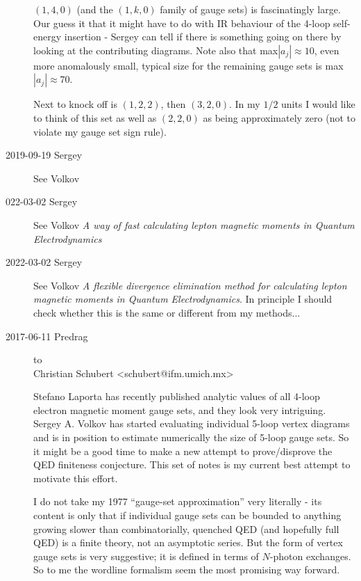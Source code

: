 \begin{description}
$(1,4,0)$ (and the $(1,k,0)$ family of gauge sets) is fascinatingly
large. Our guess it that it might have to do with IR behaviour of the
4-loop self-energy insertion - Sergey can tell if there is something
going on there by looking at the contributing diagrams.
Note also that max$|a_j|\approx 10$, even more anomalously small, typical
size for the remaining gauge sets is max$|a_j|\approx 70$.

Next to knock off is $(1,2,2)$, then $(3,2,0)$. In my $1/2$ units I would
like to think of this set as well as $(2,2,0)$ as being approximately zero
(not to violate my gauge set sign rule).

\item[2019-09-19 Sergey] See Volkov {\em }

\item[022-03-02 Sergey] See Volkov
{\em A way of fast calculating lepton magnetic moments in
Quantum Electrodynamics}

\item[2022-03-02 Sergey] See Volkov
{\em A flexible divergence elimination method for calculating
lepton magnetic moments in {Quantum Electrodynamics}}.
In principle I should check whether this is the same or different from
my methods...


\newpage
\item[2017-06-11 Predrag] to
\\
Christian Schubert <schubert@ifm.umich.mx>
%
%

Stefano Laporta  has recently published analytic values of all 4-loop
electron magnetic moment gauge sets, and they look very intriguing.
Sergey  A. Volkov has started evaluating individual 5-loop vertex
diagrams and is in position to estimate numerically the size of 5-loop
gauge sets. So it might be a good time to make a new attempt to prove/disprove
the QED finiteness conjecture. This set of notes is my current best attempt
to motivate this effort.

I do not take my 1977 ``gauge-set approximation'' very literally - its
content is only that if individual gauge sets can be bounded to anything
growing slower than combinatorially, quenched QED (and hopefully full
QED) is a finite theory, not an asymptotic series. But the form of vertex
gauge sets is very suggestive; it is defined in terms of $N$-photon
exchanges. So to me the wordline formalism seem the most promising way
forward.


\end{description}
